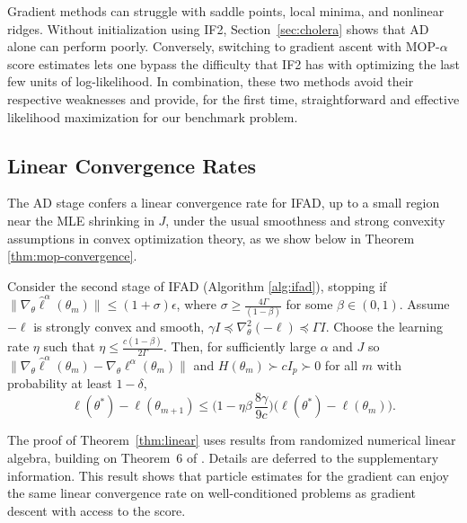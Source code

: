 \documentclass[9pt,twocolumn,pnasresearcharticle]{pnas-new}
\newcommand\arxiv[2]{#2} %
\begin{document}
Gradient methods can struggle with saddle points, local minima, and nonlinear ridges.
Without initialization using IF2, Section~\ref{sec:cholera} shows that AD alone can perform poorly.
Conversely, switching to gradient ascent with MOP-$\alpha$ score estimates lets one bypass the difficulty that IF2 has with optimizing the last few units of log-likelihood. 
In combination, these two methods avoid their respective weaknesses and provide, for the first time, straightforward and effective likelihood maximization for our benchmark problem.

\arxiv{}{\vspace*{-2mm}}
\subsection{Linear Convergence Rates}

The AD stage confers a linear convergence rate for IFAD, up to a small region near the MLE shrinking in $J$, under the usual smoothness and strong convexity assumptions in convex optimization theory, as we show below in Theorem \ref{thm:mop-convergence}.

\begin{thm} \label{thm:linear}
    
Consider the second stage of IFAD (Algorithm \ref{alg:ifad}), stopping if $\|\nabla_\theta \hat\ell^\alpha(\theta_m)\| \leq (1+\sigma) \epsilon$, where $\sigma \geq \frac{4 \Gamma}{(1-\beta)}$ for some $\beta \in (0,1)$. Assume $-\ell$ is strongly convex and smooth, $\gamma I \preceq \nabla_\theta^2 (-\ell) \preceq \Gamma I$. Choose the learning rate $\eta$ such that $\eta \leq \frac{c(1-\beta)}{2\Gamma}$. Then, for sufficiently large $\alpha$ and $J$ so $\|\nabla_\theta \hat\ell^\alpha(\theta_m) - \nabla_\theta\ell^\alpha(\theta_m)\|$ and $H(\theta_m) \succ cI_p \succ 0$ for all $m$ with probability at least $1-\delta$,
\arxiv{}{\vspace*{-2mm}}
$$
\ell(\theta^*) - \ell(\theta_{m+1}) \leq \Big(1-\eta\beta\, \frac{8\gamma}{9c}\Big)\big(\ell(\theta^*)-\ell(\theta_m)\big).
$$
\label{thm:mop-convergence}
\end{thm}
\arxiv{}{\vspace*{-7mm}}
The proof of Theorem~\ref{thm:linear} uses results from randomized numerical linear algebra, building on Theorem~6 of \cite{mahoney16}. 
Details are deferred to \arxiv{Appendix~\ref{appendix:convergence}}{the supplementary information}. 
This result shows that particle estimates for the gradient can enjoy the same linear convergence rate on well-conditioned problems as gradient descent with access to the score. 
\end{document}
